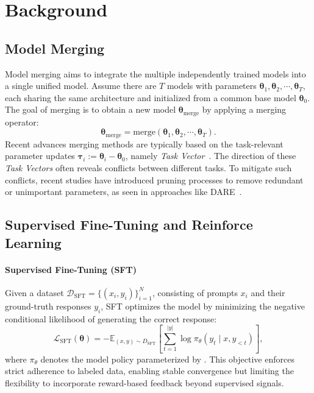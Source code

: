 \documentclass{article} %
\begin{document}


\section{Background}

\subsection{Model Merging}

Model merging aims to integrate the multiple independently trained models into a single unified model.  
Assume there are $T$ models with parameters $\bm{\theta}_1, \bm{\theta}_2, \cdots, \bm{\theta}_T$, each sharing the same architecture and initialized from a common base model $\bm{\theta}_0$. The goal of merging is to obtain a new model $\bm{\theta}_{\text{merge}}$ by applying a merging operator:
\begin{equation}
    \bm{\theta}_{\text{merge}} = \text{merge}(\bm{\theta}_1, \bm{\theta}_2, \cdots, \bm{\theta}_T).
\end{equation}
Recent advances merging methods are typically based on the task-relevant parameter updates $\bm{\tau}_i:= \bm{\theta}_i-\bm{\theta}_0$, namely \textit{Task Vector}~\citep{ilharco2023editingmodelstaskarithmetic}. The direction of these \textit{Task Vectors} often reveals conflicts between different tasks. To mitigate such conflicts, recent studies have introduced pruning processes to remove redundant or unimportant parameters, as seen in approaches like DARE~\citep{yadav2023ties, yu2024language, wang2024localizing}.


\subsection{Supervised Fine-Tuning and Reinforce Learning}
 
\paragraph{Supervised Fine-Tuning (SFT)} Given a dataset $\mathcal{D}_{\text{SFT}} = \{(x_i, y_i)\}_{i=1}^N$, consisting of prompts $x_i$ and their ground-truth responses $y_i$, SFT optimizes the model by minimizing the negative conditional likelihood of generating the correct response:
\begin{equation}
    \mathcal{L}_{\text{SFT}}(\bm{\theta}) = - \mathbb{E}_{(x,y)\sim D_{\text{SFT}}} \left[ \sum_{t=1}^{|y|} \log \pi_\theta(y_t \mid x, y_{<t}) \right],
\end{equation}
where $\pi_\theta$ denotes the model policy parameterized by \bm{$\theta$}.  
This objective enforces strict adherence to labeled data, enabling stable convergence but limiting the flexibility to incorporate reward-based feedback beyond supervised signals.
\end{document}
